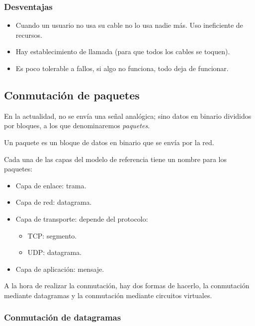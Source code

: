 \subsubsection{Desventajas}
\begin{itemize}
    \item Cuando un usuario no usa su cable no lo usa nadie más. Uso ineficiente de recursos.
    \item Hay establecimiento de llamada (para que todos los cables se toquen).
    \item Es poco tolerable a fallos, si algo no funciona, todo deja de funcionar.
\end{itemize}

\subsection{Conmutación de paquetes}
En la actualidad, no se envía una señal analógica; sino datos en binario divididos por bloques, a los que denominaremos \emph{paquetes}.
\begin{definicion}[Paquete]
    Un paquete es un bloque de datos en binario que se envía por la red.
\end{definicion}

Cada una de las capas del modelo de referencia tiene un nombre para los paquetes:
\begin{itemize}
    \item Capa de enlace: trama.
    \item Capa de red: datagrama.
    \item Capa de transporte: depende del protocolo:
        \begin{itemize}
            \item \acrshort{TCP}: segmento.
            \item \acrshort{UDP}: datagrama.
        \end{itemize}
    \item Capa de aplicación: mensaje.
\end{itemize}

A la hora de realizar la conmutación, hay dos formas de hacerlo, la conmutación mediante datagramas y la conmutación mediante circuitos virtuales.

\subsubsection{Conmutación de datagramas}

